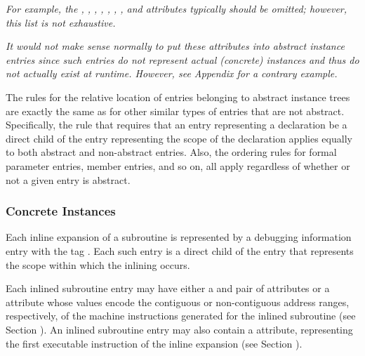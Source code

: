 \textit{For example,
the \DWATlowpc,
\DWAThighpc, 
\DWATranges, 
\DWATentrypc, 
\DWATlocation,
\DWATreturnaddr, 
\DWATstartscope, 
and 
\DWATsegment{}
attributes typically should be omitted; however, this list is not 
exhaustive.}

\textit{It would not make sense normally to put these attributes into
abstract instance entries since such entries do not represent
actual (concrete) instances and thus do not actually exist at
run\dash time.  However, 
see Appendix  
for a contrary example.}

The rules for the relative location of entries belonging to
abstract instance trees are exactly the same as for other
similar types of entries that are not abstract. Specifically,
the rule that requires that an entry representing a declaration
be a direct child of the entry representing the scope of the
declaration applies equally to both abstract and non-abstract
entries. Also, the ordering rules for formal parameter entries,
member entries, and so on, all apply regardless of whether
or not a given entry is abstract.

\subsubsection{Concrete Instances}
\label{chap:concreteinstances}

Each inline expansion of a subroutine is represented
by a debugging information entry with the 
tag \DWTAGinlinedsubroutineTARG. Each such entry is a direct
child of the entry that represents the scope within which
the inlining occurs.

Each inlined subroutine entry may have either a 
\DWATlowpc{}
and \DWAThighpc{} pair of attributes
or a \DWATranges{}
attribute whose values encode the contiguous or non-contiguous
address ranges, respectively, of the machine instructions
generated for the inlined subroutine (see 
Section ). 
An\hypertarget{chap:DWATentrypcentryaddressofinlinedsubprogram}{}
inlined subroutine entry may 
also 
contain 
a 
\DWATentrypc{}
attribute, representing the first executable instruction of
the inline expansion (see 
Section ).

